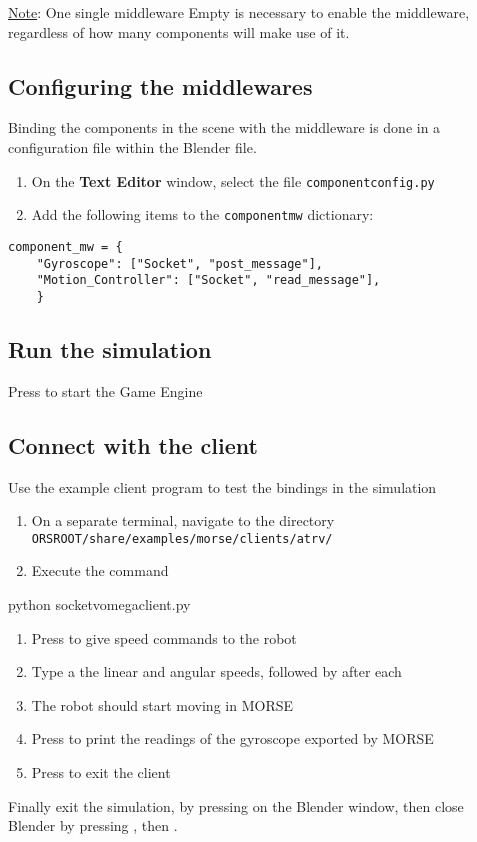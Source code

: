 \documentclass[twoside,a4paper,10pt]{report}
\newcommand{\dokutitleleveltree}[1]{\subsection{#1}}
\newcommand{\dokubold}[1]{\textbf{#1}}
\newcommand{\dokumonospace}[1]{\texttt{#1}}
\newcommand{\dokuunderline}[1]{\underline{#1}}
\newcommand{\dokuitem}{\item}
\begin{document}
\dokuunderline{Note}: One single middleware Empty is necessary to enable the middleware, regardless of how many components will make use of it.


\dokutitleleveltree{Configuring the middlewares}
\label{7c1b9786b6402b908e3042548cd3c1c6}%
Binding the components in the scene with the middleware is done in a configuration file within the Blender file.



\begin{enumerate}\dokuitem  On the \dokubold{Text Editor} window, select the file \dokumonospace{component{\textunderscore}config.py}
\dokuitem  Add the following items to the \dokumonospace{component{\textunderscore}mw} dictionary:
\end{enumerate}

\lstset{language=python}
\begin{lstlisting}
component_mw = {
    "Gyroscope": ["Socket", "post_message"],
    "Motion_Controller": ["Socket", "read_message"],
	}

\end{lstlisting}

\dokutitleleveltree{Run the simulation}
\label{62874528899bc63c891e142b192d89b7}%
Press  to start the Game Engine


\dokutitleleveltree{Connect with the client}
\label{646d760bcdaf8445e5fb3dbad2c443e5}%
Use the example client program to test the bindings in the simulation



\begin{enumerate}\dokuitem  On a separate terminal, navigate to the directory \dokumonospace{{\textdollar}ORS{\textunderscore}ROOT/share/examples/morse/clients/atrv/}
\dokuitem  Execute the command
\end{enumerate}
    {\textdollar} python socket{\textunderscore}v{\textunderscore}omega{\textunderscore}client.py


\begin{enumerate}\dokuitem  Press  to give speed commands to the robot
\dokuitem  Type a the linear and angular speeds, followed by  after each
\dokuitem  The robot should start moving in MORSE
\dokuitem  Press  to print the readings of the gyroscope exported by MORSE
\dokuitem  Press  to exit the client
\end{enumerate}

Finally exit the simulation, by pressing  on the Blender window, then close Blender by pressing , then .
\end{document}
